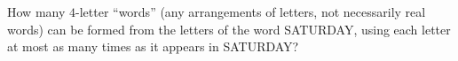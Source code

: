 How many $4$-letter ``words'' (any arrangements of letters, not necessarily real words) can be formed from the letters of the word SATURDAY, using each letter at most as many times as it appears in SATURDAY?
